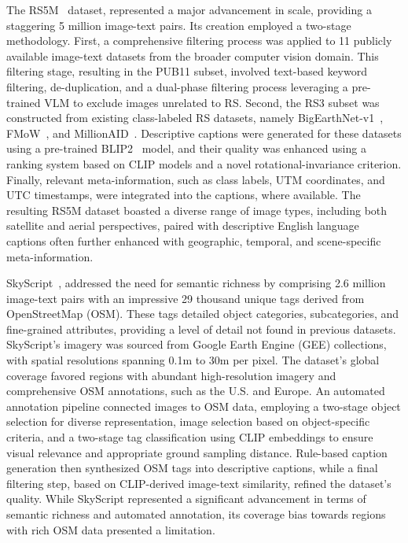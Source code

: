 The RS5M~\cite{zhang2024rs5m} dataset, represented a major advancement in scale, providing a staggering 5 million image-text pairs. Its creation employed a two-stage methodology. First, a comprehensive filtering process was applied to 11 publicly available image-text datasets from the broader computer vision domain. This filtering stage, resulting in the PUB11 subset, involved text-based keyword filtering, de-duplication, and a dual-phase filtering process leveraging a pre-trained VLM to exclude images unrelated to RS. Second, the RS3 subset was constructed from existing class-labeled RS datasets, namely BigEarthNet-v1~\cite{sumbul2019bigearthnet, sumbul2021bigearthnet}, FMoW~\cite{christie2018functional}, and MillionAID~\cite{long2021creating}. Descriptive captions were generated for these datasets using a pre-trained BLIP2~\cite{li2023blip} model, and their quality was enhanced using a ranking system based on CLIP models and a novel rotational-invariance criterion. Finally, relevant meta-information, such as class labels, UTM coordinates, and UTC timestamps, were integrated into the captions, where available. The resulting RS5M dataset boasted a diverse range of image types, including both satellite and aerial perspectives, paired with descriptive English language captions often further enhanced with geographic, temporal, and scene-specific meta-information.

SkyScript~\cite{wang2024skyscript}, addressed the need for semantic richness by comprising 2.6 million image-text pairs with an impressive 29 thousand unique tags derived from OpenStreetMap (OSM). These tags detailed object categories, subcategories, and fine-grained attributes, providing a level of detail not found in previous datasets. SkyScript's imagery was sourced from Google Earth Engine (GEE) collections, with spatial resolutions spanning 0.1m to 30m per pixel. The dataset's global coverage favored regions with abundant high-resolution imagery and comprehensive OSM annotations, such as the U.S. and Europe. An automated annotation pipeline connected images to OSM data, employing a two-stage object selection for diverse representation, image selection based on object-specific criteria, and a two-stage tag classification using CLIP embeddings to ensure visual relevance and appropriate ground sampling distance. Rule-based caption generation then synthesized OSM tags into descriptive captions, while a final filtering step, based on CLIP-derived image-text similarity, refined the dataset's quality. While SkyScript represented a significant advancement in terms of semantic richness and automated annotation, its coverage bias towards regions with rich OSM data presented a limitation.


